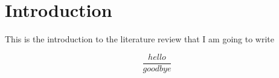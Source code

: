 \chapter{Introduction}

This is the introduction to the literature review that I am going to write

\begin{equation}
    \frac{hello}{goodbye}
\end{equation}